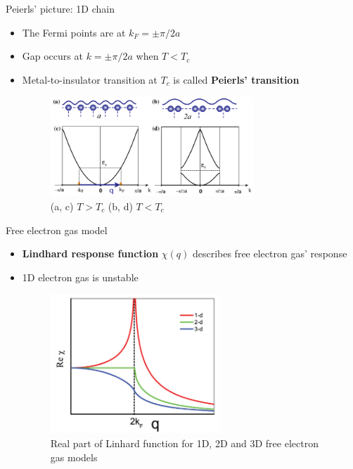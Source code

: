 \documentclass{beamer}
\begin{document}
\begin{frame}{Peierls' picture: 1D chain}
\begin{itemize}
\item The Fermi points are at $k_F = \pm \pi / 2 a$ %
\item Gap occurs at $k = \pm \pi / 2 a$ when $T < T_c$
\item Metal-to-insulator transition at $T_c$ is called \textbf{Peierls' transition}
\begin{figure}
\includegraphics[width=3in]{figs/density_fermi.pdf}
\caption{\label{fig:density_fermi} (a, c) $T > T_c$ (b, d) $T < T_c$}
\end{figure}
\end{itemize}
\end{frame}

\begin{frame}{Free electron gas model}
\begin{itemize}
\item \textbf{Lindhard response function} $\chi(q)$ describes free electron gas' response
\item 1D electron gas is unstable
\begin{figure}
\includegraphics[width=2.5in]{figs/lindhart.png}
\caption{\label{fig:lindhart} Real part of Linhard function for 1D, 2D and 3D free electron gas models}
\end{figure}
\end{itemize}
\end{frame}
\end{document}
